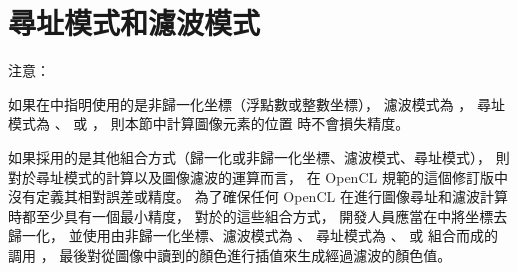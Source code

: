 \section{尋址模式和濾波模式}







注意：

如果在中指明使用的是非歸一化坐標（浮點數或整數坐標），
濾波模式為 ，
尋址模式為 、 
或 ，
則本節中計算圖像元素的位置  時不會損失精度。

如果採用的是其他組合方式（歸一化或非歸一化坐標、濾波模式、尋址模式），
則對於尋址模式的計算以及圖像濾波的運算而言，
在 OpenCL 規範的這個修訂版中沒有定義其相對誤差或精度。
為了確保任何 OpenCL 在進行圖像尋址和濾波計算時都至少具有一個最小精度，
對於的這些組合方式，
開發人員應當在中將坐標去歸一化，
並使用由非歸一化坐標、濾波模式為 、
尋址模式為 、 
或  組合而成的
調用 ，
最後對從圖像中讀到的顏色進行插值來生成經過濾波的顏色值。
